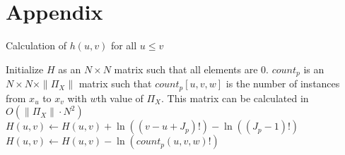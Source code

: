 





\section*{Appendix}

\begin{algorithm}
  \caption{ Calculation of $h(u,v)$ for all $u \leq v$}
  \label{alg:h}
  \begin{algorithmic}[1]
  \State Initialize $H$ as an $N \times N$ matrix such that all elements are 0.
  \State $count_p$ is an $N \times N \times \|\Pi_X\|$ matrix such that $count_p [u,v,w]$ is the number of instances from $x_u$ to $x_v$ with $w$th value of $\Pi_X$. This matrix can be calculated in $O(\|\Pi_X\| \cdot N^2)$
      \State $H(u,v) \leftarrow H(u,v) + \ln((v-u + J_p)!) - \ln((J_p -1)!)$
        \State $H(u,v) \leftarrow H(u,v) - \ln( count_p(u,v,w)!)$
      \EndFor
    \EndFor
  \EndFor
    \State {}
  \EndFor
  \end{algorithmic}
\end{algorithm}



